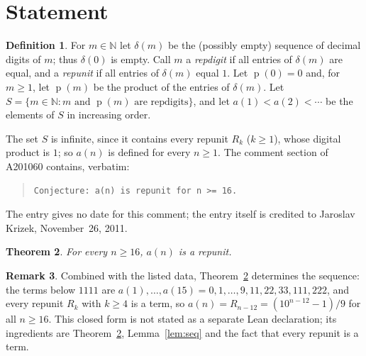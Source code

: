 \documentclass[11pt]{amsart}
\theoremstyle{plain}
\newtheorem{theorem}{Theorem}
\theoremstyle{definition}
\newtheorem{definition}[theorem]{Definition}
\newtheorem{remark}[theorem]{Remark}
\newcommand{\N}{\mathbb{N}}
\newcommand{\dprod}{\operatorname{p}}
\begin{document}
\section{Statement}\label{sec:statement}

\begin{definition}\label{def:main}
For $m\in\N$ let $\delta(m)$ be the (possibly empty) sequence of decimal digits of $m$; thus $\delta(0)$ is empty. Call $m$ a \emph{repdigit} if all entries of $\delta(m)$ are equal, and a \emph{repunit} if all entries of $\delta(m)$ equal $1$. Let $\dprod(0)=0$ and, for $m\ge1$, let $\dprod(m)$ be the product of the entries of $\delta(m)$. Let $S=\{m\in\N: m \text{ and } \dprod(m) \text{ are repdigits}\}$, and let $a(1)<a(2)<\cdots$ be the elements of $S$ in increasing order.
\end{definition}

The set $S$ is infinite, since it contains every repunit $R_k$ ($k\ge1$), whose digital product is $1$; so $a(n)$ is defined for every $n\ge1$.
The comment section of A201060 \cite{A201060} contains, verbatim:
\begin{quote}
{\small\texttt{Conjecture: a(n) is repunit for n >= 16.}}
\end{quote}
The entry gives no date for this comment; the entry itself is credited to Jaroslav Krizek, November~26, 2011.

\begin{theorem}\label{thm:main}
For every $n\ge16$, $a(n)$ is a repunit.
\end{theorem}

\begin{remark}\label{rem:closed}
Combined with the listed data, Theorem~\ref{thm:main} determines the sequence: the terms below $1111$ are $a(1),\dots,a(15)=0,1,\dots,9,11,22,33,111,222$, and every repunit $R_k$ with $k\ge4$ is a term, so $a(n)=R_{n-12}=(10^{n-12}-1)/9$ for all $n\ge16$. This closed form is not stated as a separate Lean declaration; its ingredients are Theorem~\ref{thm:main}, Lemma~\ref{lem:seq} and the fact that every repunit is a term.
\end{remark}
\end{document}
